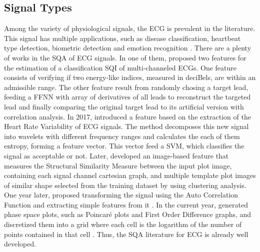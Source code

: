 \subsection{Signal Types}

Among the variety of physiological signals, the \gls{ECG} is prevalent in the literature. This signal has multiple applications, such as disease classification, heartbeat type detection, biometric detection and emotion recognition \cite{ecg-1}. There are a plenty of works in the \gls{SQA} of ECG signals. In one of them, \citeauthor{ecg-2} proposed two features for the estimation of a classification \gls{SQI} of multi-channeled \gls{ECG}s. One feature consists of verifying if two energy-like indices, measured in deciBels, are within an admissible range. The other feature result from randomly chosing a target lead, feeding a \gls{FFNN} with array of derivatives of all leads to reconstruct the targeted lead and finally comparing the original target lead to its artificial version with correlation analysis. In 2017, \citeauthor{ecg-3} introduced a feature based on the extraction of the Heart Rate Variability of \gls{ECG} signals. The method decomposes this new signal into wavelets with different frequency ranges and calculates the each of them entropy, forming a feature vector. This vector feed a \gls{SVM}, which classifies the signal as acceptable or not. Later, \citeauthor{ecg-4} developed an image-based feature that measures the Structural Similarity Measure between the input plot image, containing each signal channel cartesian graph, and multiple template plot images of similar shape selected from the training dataset by using clustering analysis. One year later, \citeauthor{ecg-5} proposed transforming the signal using the Auto Correlation Function and extracting simple features from it \cite{ecg-5}. In the current year, \citeauthor{ecg-6} generated phase space plots, such as Poincaré plots and First Order Difference graphs, and discretized them into a grid where each cell is the logarithm of the number of points contained in that cell \cite{ecg-6}. Thus, the \gls{SQA} literature for \gls{ECG} is already well developed.

